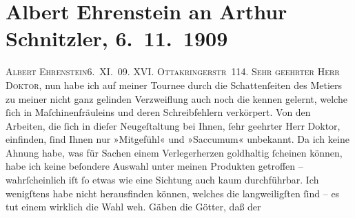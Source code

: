 

         
         \renewcommand{\erwaehntePersonen}{Personen: Samuel Fischer}
         \renewcommand{\erwaehnteOrte}{Orte: Ottakringerstraße, Wien}
         \renewcommand{\erwaehnteWerke}{Werke: Die neue Rundschau, Mitgefühl, Saccumum}
               \section[Albert Ehrenstein an Arthur Schnitzler, 6. 11. 1909]{ Albert Ehrenstein an Arthur Schnitzler, 6. 11. 1909}\nopagebreak{}\rehead{ }\begin{ledgroupsized}[t]{13cm}\normalsize\beginnumbering \toendnotes[C]{\smallbreak\pagebreak[2]} 
\pstart
           {\pb}\textsc{Albert Ehrenstein}\hfill 6. XI. 09. \pend
           \pstart
           \textsc{XVI. Ottakringerstr 114.}\pend
           \pstart{}\textsc{Sehr geehrter Herr Doktor,}\pend\pstart
           nun habe ich auf meiner Tournee durch die Schattenſeiten des Metiers zu meiner nicht
               ganz gelinden Verzweiflung auch noch die kennen gelernt, welche ſich in
               Maſchinenfräuleins und deren Schreibfehlern verkörpert. Von den Arbeiten, die ſich in
               dieſer Neugeſtaltung bei Ihnen, ſehr geehrter Herr Doktor, einfinden, ſind Ihnen nur
                  »Mitgefühl« und »Saccumum« unbekannt.\pend
           \pstart
           Da ich keine Ahnung habe, was für Sachen einem Verlegerherzen goldhaltig ſcheinen
               können, habe ich keine beſondere Auswahl {\pb}unter meinen Produkten getroffen – wahrſcheinlich iſt ſo etwas wie eine Sichtung
               auch kaum durchführbar. Ich wenigſtens habe nicht herausfinden können, welches die
               langweiligſten ſind – es tut einem wirklich die Wahl weh. Gäben die Götter, daß der

\end{ledgroupsized}
